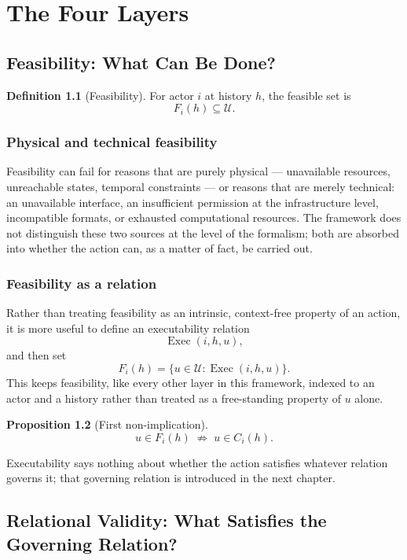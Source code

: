 \documentclass[11pt]{report}
\theoremstyle{definition}
\newtheorem{definition}{Definition}[chapter]
\theoremstyle{plain}
\newtheorem{proposition}[definition]{Proposition}
\newcommand{\Uni}{\mathcal{U}}
\begin{document}
\part{The Four Layers}

\chapter{Feasibility: What Can Be Done?}

\begin{definition}[Feasibility]
For actor $i$ at history $h$, the feasible set is
\[
F_i(h) \subseteq \Uni.
\]
\end{definition}

\section{Physical and technical feasibility}
Feasibility can fail for reasons that are purely physical --- unavailable resources, unreachable states, temporal constraints --- or reasons that are merely technical: an unavailable interface, an insufficient permission at the infrastructure level, incompatible formats, or exhausted computational resources. The framework does not distinguish these two sources at the level of the formalism; both are absorbed into whether the action can, as a matter of fact, be carried out.

\section{Feasibility as a relation}
Rather than treating feasibility as an intrinsic, context-free property of an action, it is more useful to define an executability relation
\[
\operatorname{Exec}(i,h,u),
\]
and then set
\[
F_i(h) = \{u \in \Uni : \operatorname{Exec}(i,h,u)\}.
\]
This keeps feasibility, like every other layer in this framework, indexed to an actor and a history rather than treated as a free-standing property of $u$ alone.

\begin{proposition}[First non-implication]
\[
u \in F_i(h) \;\not\Rightarrow\; u \in C_i(h).
\]
\end{proposition}
Executability says nothing about whether the action satisfies whatever relation governs it; that governing relation is introduced in the next chapter.

\chapter{Relational Validity: What Satisfies the Governing Relation?}
\end{document}
